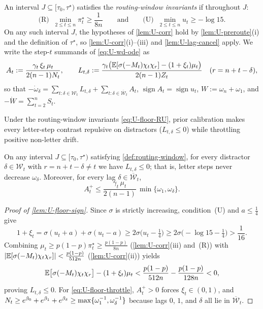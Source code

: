 \begin{definition}
\label{def:routing-window}
An interval $J \subseteq [\tau_0, \tau^\star)$ satisfies the \emph{routing-window invariants} if throughout $J$:
\begin{equation}
  \text{(R)}\;\; \min_{2\le t\le n}\pi_t^\star \ge \frac{1}{8n}
  \qquad\text{and}\qquad
  \text{(U)}\;\; \min_{2\le t\le n} u_t \ge -\log 15 .
  \label{eq:U-floor-RU}
\end{equation}
On any such interval $J$, the hypotheses of \cref{lem:U-corr} hold by \cref{lem:U-preroute}(i) and the definition of $\tau^\star$, so \cref{lem:U-corr}(i)--(iii) and \cref{lem:U-lag-cancel} apply. We write the step-$t$ summands of \cref{eq:U-wd-ode} as
\[
  A_t := \frac{\gamma_t\,\xi_t\,\mu_t}{2(n-1)N_t},
  \qquad
  L_{t,\delta} := \frac{\gamma_t\bigl(\mathbb E[\sigma(-M_t)\chi_t\chi_r] - (1+\xi_t)\mu_t\bigr)}{2(n-1)Z_t}
  \quad (r = n+t-\delta),
\]
so that $-\dot\omega_\delta = \sum_{t:\delta\in\mathcal W_t} L_{t,\delta} + \sum_{t:\delta\in\overline{\mathcal W}_t} A_t$, $\operatorname{sign}A_t = \operatorname{sign}u_t$, $W := \omega_n + \omega_1$, and $-\dot W = \sum_{t=2}^n S_t$.
\end{definition}

Under the routing-window invariants \cref{eq:U-floor-RU}, prior calibration makes every letter-step contrast repulsive on distractors ($L_{t,\delta} \le 0$) while throttling positive non-letter drift.

\begin{lemma}
\label{lem:U-floor-sign}
On any interval $J \subseteq [\tau_0, \tau^\star)$ satisfying \cref{def:routing-window}, for every distractor $\delta \in \mathcal W_t$ with $r = n+t-\delta \ne t$ we have $L_{t,\delta} \le 0$; that is, letter steps never decrease $\omega_\delta$. Moreover, for every lag $\delta \in \overline{\mathcal W}_t$,
\begin{equation}
  A_t^+ \le \frac{\gamma_t\,\mu_t}{2(n-1)}\,\min\{\omega_1, \omega_\delta\}.
  \label{eq:U-floor-throttle}
\end{equation}
\end{lemma}
\begin{proof}[Proof of \cref{lem:U-floor-sign}]
Since $\sigma$ is strictly increasing, condition~(U) and $a \le \frac{1}{4}$ give
\[
  1 + \xi_t = \sigma(u_t+a) + \sigma(u_t-a)
  \ge 2\sigma\bigl(u_t - \tfrac{1}{4}\bigr)
  \ge 2\sigma\bigl(-\log 15 - \tfrac{1}{4}\bigr) > \frac{1}{16}.
\]
Combining $\mu_t \ge p(1-p)\pi_t^\star \ge \frac{p(1-p)}{8n}$ (\cref{lem:U-corr}(iii) and~(R)) with $\lvert\mathbb E[\sigma(-M_t)\chi_t\chi_r]\rvert < \frac{p(1-p)}{512n}$ (\cref{lem:U-corr}(ii)) yields
\[
  \mathbb E\bigl[\sigma(-M_t)\chi_t\chi_r\bigr] - (1 + \xi_t)\mu_t
  < \frac{p(1-p)}{512n} - \frac{p(1-p)}{128n} < 0,
\]
proving $L_{t,\delta} \le 0$. For \cref{eq:U-floor-throttle}, $A_t^+ > 0$ forces $\xi_t \in (0,1)$, and $N_t \ge e^{\beta_0} + e^{\beta_1} + e^{\beta_\delta} \ge \max\{\omega_1^{-1}, \omega_\delta^{-1}\}$ because lags $0$, $1$, and $\delta$ all lie in $\overline{\mathcal W}_t$.
\end{proof}

